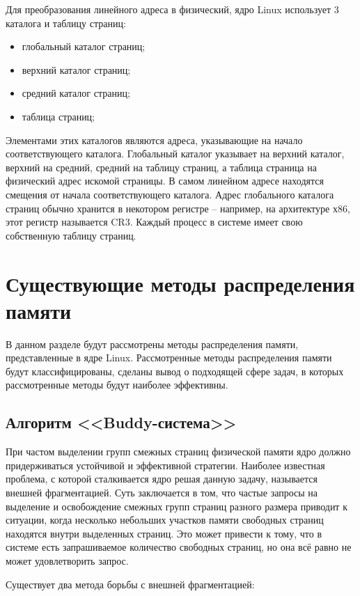 Для преобразования линейного адреса в физический, ядро Linux использует 3 каталога и таблицу страниц:

\begin{itemize}
	\item глобальный каталог страниц;
	\item верхний каталог страниц;
	\item средний каталог страниц;
	\item таблица страниц;
\end{itemize}

Элементами этих каталогов являются адреса, указывающие на начало соответствующего каталога. Глобальный каталог указывает на верхний каталог, верхний на средний, средний на таблицу страниц, а таблица страница на физический адрес искомой страницы. В самом линейном адресе находятся смещения от начала соответствующего каталога. Адрес глобального каталога страниц обычно хранится в некотором регистре -- например, на архитектуре х86, этот регистр называется CR3. Каждый процесс в системе имеет свою собственную таблицу страниц.

\section{Существующие методы распределения памяти}

В данном разделе будут рассмотрены методы распределения памяти, представленные в ядре Linux. Рассмотренные методы распределения памяти будут классифицированы, сделаны вывод о подходящей сфере задач, в которых рассмотренные методы будут наиболее эффективны.

\subsection{Алгоритм <<Buddy-система>>}

При частом выделении групп смежных страниц физической памяти ядро должно придерживаться устойчивой и эффективной стратегии. Наиболее известная проблема, с которой сталкивается ядро решая данную задачу, называется внешней фрагментацией. Суть заключается в том, что частые запросы на выделение и освобождение смежных групп страниц разного размера приводит к ситуации, когда несколько небольших участков памяти свободных страниц находятся внутри выделенных страниц. Это может привести к тому, что в системе есть запрашиваемое количество свободных страниц, но она всё равно не может удовлетворить запрос. 

Существует два метода борьбы с внешней фрагментацией:

